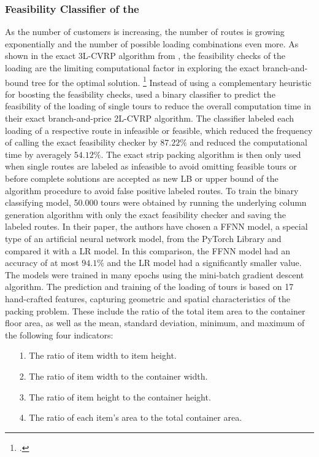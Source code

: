 \subsubsection{Feasibility Classifier of the }
As the number of customers is increasing, the number of routes is growing exponentially and the number of
possible loading combinations even more. As shown in the exact \gls{3L-CVRP} algorithm from \cite{tamke_branch-and-cut_2024},
the feasibility checks of the loading are the limiting computational factor in
exploring the exact branch-and-bound tree for the optimal solution. \footcite[cf.][p. 22]{tamke_branch-and-cut_2024}
Instead of using a complementary heuristic for boosting the feasibility checks,
\textcite{zhang_learning-based_2022} used a binary classifier to predict the feasibility of the
loading of single tours to reduce the overall computation time in their exact branch-and-price \gls{2L-CVRP}
algorithm. The classifier labeled each loading of a respective route in infeasible or feasible, which
reduced the frequency of calling the exact feasibility checker by $87.22\%$ and reduced the computational time by averagely $54.12\%$.
The exact strip packing algorithm is then only used when single routes are labeled as infeasible to avoid
omitting feasible tours or before complete solutions are accepted as new \gls{LB} or upper bound of the
algorithm procedure to avoid false positive labeled routes. To train the binary classifying model,
50.000 tours were obtained by running the underlying column generation
algorithm with only the exact feasibility checker and saving the labeled routes.
In their paper, the authors have chosen a \gls{FFNN} model, a special type of an artificial neural network model,
from the PyTorch Library and compared it with a \gls{LR} model. In this comparison, the \gls{FFNN} model had
an accuracy of at most $94.1\%$ and the \gls{LR} model had a significantly smaller value.
The models were trained in many epochs using the mini-batch gradient descent algorithm. The prediction and training
of the loading of tours is based on 17 hand-crafted features, capturing geometric
and spatial characteristics of the packing problem. These include the ratio of the total item area
to the container floor area, as well as the mean, standard deviation, minimum, and maximum of
the following four indicators:
\begin{itemize}
    \item[1.] The ratio of item width to item height.
    \item[2.] The ratio of item width to the container width.
    \item[3.] The ratio of item height to the container height.
    \item[4.] The ratio of each item’s area to the total container area.
\end{itemize}

